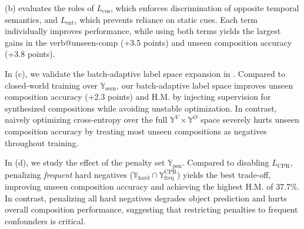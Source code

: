  (b) evaluates the roles of $L_{\cos}$, which enforces discrimination of opposite temporal semantics, and $L_\text{ent}$, which prevents reliance on static cues.
Each term individually improves performance, while using both terms yields the largest gains in the verb@unseen-comp (+3.5 points) and unseen composition accuracy (+3.8 points).




In  (c), we validate the batch-adaptive label space expansion in \cpr{}.
Compared to closed-world training over $\mathbb{Y}_{\text{seen}}$, our batch-adaptive label space improves unseen composition accuracy (+2.3 points) and H.M. by injecting supervision for synthesized compositions while avoiding unstable optimization.
In contrast, naively optimizing cross-entropy over the full $\mathbb{Y}^V \times \mathbb{Y}^O$ space severely hurts unseen composition accuracy by treating most unseen compositions as negatives throughout training.




In  (d), we study the effect of the penalty set $\mathbb{Y}_{\text{pen}}$.
Compared to disabling $L_{\text{CPR}}$, penalizing \emph{frequent} hard negatives ($\mathbb{Y}_{\text{hard}}\cap\mathbb{Y}_{\text{freq}}^\text{CPR}$) yields the best trade-off, improving unseen composition accuracy and achieving the highest H.M. of 37.7\%.
In contrast, penalizing all hard negatives degrades object prediction and hurts overall composition performance, suggesting that restricting penalties to frequent confounders is critical.


